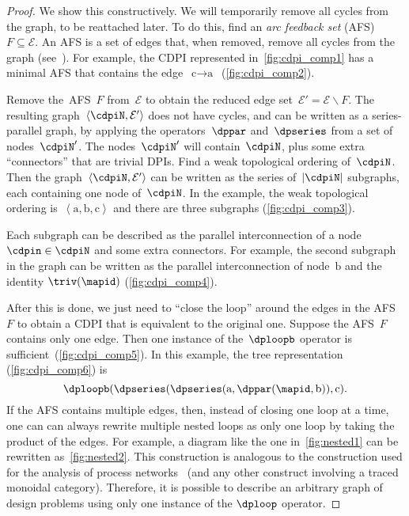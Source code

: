 \begin{proof}
  We show this constructively. We will temporarily remove all cycles
  from the graph, to be reattached later. To do this, find an \emph{arc
  feedback set} (AFS) $F\subseteq\mathcal{E}$. An AFS is a set of edges
  that, when removed, remove all cycles from the graph (see~\cite{golovach15incremental}).
  For example, the CDPI represented in~\cref{fig:cdpi_comp1} has a minimal
  AFS that contains the edge~$\text{c}\rightarrow\text{a}$~(\cref{fig:cdpi_comp2}).


  Remove the~AFS~$F$ from~$\mathcal{E}$ to obtain the reduced edge
  set~$\mathcal{E}'=\mathcal{E}\backslash F$. The resulting graph~$\left\langle \cdpiN,\mathcal{E}'\right\rangle $
  does not have cycles, and can be written as a series-parallel graph,
  by applying the operators~$\dppar$ and~$\dpseries$ from a set
  of nodes~$\cdpiN'$. The nodes~$\cdpiN'$ will contain~$\cdpiN$,
  plus some extra ``connectors'' that are trivial DPIs. Find a weak
  topological ordering of~$\cdpiN$. Then the graph~$\left\langle \cdpiN,\mathcal{E}'\right\rangle $
  can be written as the series of~$|\cdpiN|$ subgraphs, each containing
  one node of~$\cdpiN$. In the example, the weak topological ordering
  is~$\left\langle \text{a},\text{b},\text{c}\right\rangle $ and there
  are three subgraphs (\cref{fig:cdpi_comp3}).


  \noindent Each subgraph can be described as the parallel interconnection
  of a node~$\cdpin\in\cdpiN$ and some extra connectors. For example,
  the second subgraph in the graph can be written as the parallel interconnection
  of node~$\text{b}$ and the identity $\triv(\mapid)$ (\cref{fig:cdpi_comp4}).


  After this is done, we just need to ``close the loop'' around the
  edges in the AFS~$F$ to obtain a CDPI that is equivalent to the
  original one. Suppose the AFS~$F$ contains only one edge. Then one
  instance of the~$\dploopb$ operator is sufficient~(\cref{fig:cdpi_comp5}).
  In this example, the tree representation (\cref{fig:cdpi_comp6}) is
  \[
    \dploopb(\dpseries(\dpseries(\text{a},\dppar(\mapid,\text{b})),\text{c}).
  \]
  If the AFS contains multiple edges, then, instead of closing one loop
  at a time, one can can always rewrite multiple nested loops as only
  one loop by taking the product of the edges. For example, a diagram
  like the one in~\cref{fig:nested1} can be rewritten as~\cref{fig:nested2}.
  This construction is analogous to the construction used for the analysis
  of process networks~\cite{lee10} (and any other construct involving
  a traced monoidal category). Therefore, it is possible to describe
  an arbitrary graph of design problems using only one instance of the
  $\dploop$ operator.
\end{proof}

